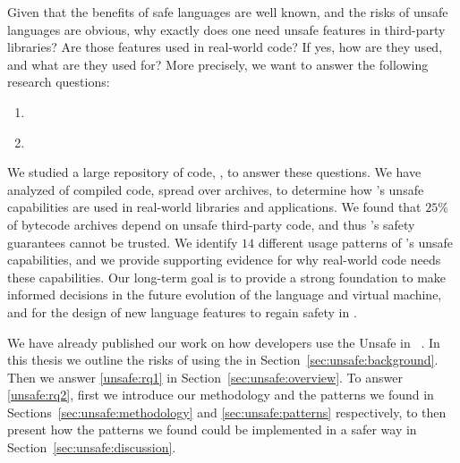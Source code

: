 Given that the benefits of safe languages are well known,
and the risks of unsafe languages are obvious,
why exactly does one need unsafe features in third-party libraries?
Are those features used in real-world code?
If yes, how are they used, and what are they used for?
More precisely, we want to answer the following research questions:

\begin{enumerate}[label=$RQ/U\arabic*:$,ref=$RQ/U\arabic*$,leftmargin=3.4\parindent]
\item\label{unsafe:rq1} {\bf \urqA} \urqAdesc{}
\item\label{unsafe:rq2} {\bf \urqB} \urqBdesc{}
\end{enumerate}

We studied a large repository of \java{} code, \mavencentral{},
to answer these questions.
We have analyzed \statreposize{} of compiled \java{} code,
spread over \statrepouniquearts{} \java{} archives,
to determine how \java{}'s unsafe capabilities are used in real-world
libraries and applications.
We found that $25\%$ of \java{} bytecode archives depend on unsafe
third-party \java{} code, and thus \java{}'s safety
guarantees cannot be trusted.
We identify $14$ different usage patterns of \java{}'s unsafe capabilities,
and we provide supporting evidence for why real-world code needs these capabilities.
Our long-term goal is to provide a strong foundation
to make informed decisions in the future evolution of the \java{} language and virtual machine,
and for the design of new language features to regain safety in \java{}.

We have already published our work on how developers use the Unsafe \api{} in \java{}~\citep{mastrangeloUseYourOwn2015}.
In this thesis we outline the risks of using the \unsafe{} \api{} in Section~\ref{sec:unsafe:background}.
Then we answer \ref{unsafe:rq1} in Section~\ref{sec:unsafe:overview}.
To answer \ref{unsafe:rq2}, first we introduce our methodology and the patterns we found in Sections~\ref{sec:unsafe:methodology} and \ref{sec:unsafe:patterns} respectively, to then present how the patterns we found could be implemented in a safer way in Section~\ref{sec:unsafe:discussion}.








